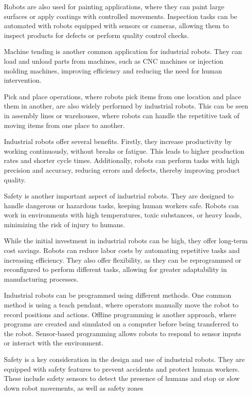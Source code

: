 Robots are also used for painting applications, where they can paint large surfaces or apply coatings with controlled movements. Inspection tasks can be automated with robots equipped with sensors or cameras, allowing them to inspect products for defects or perform quality control checks.

Machine tending is another common application for industrial robots. They can load and unload parts from machines, such as CNC machines or injection molding machines, improving efficiency and reducing the need for human intervention.

Pick and place operations, where robots pick items from one location and place them in another, are also widely performed by industrial robots. This can be seen in assembly lines or warehouses, where robots can handle the repetitive task of moving items from one place to another.

Industrial robots offer several benefits. Firstly, they increase productivity by working continuously, without breaks or fatigue. This leads to higher production rates and shorter cycle times. Additionally, robots can perform tasks with high precision and accuracy, reducing errors and defects, thereby improving product quality.

Safety is another important aspect of industrial robots. They are designed to handle dangerous or hazardous tasks, keeping human workers safe. Robots can work in environments with high temperatures, toxic substances, or heavy loads, minimizing the risk of injury to humans.

While the initial investment in industrial robots can be high, they offer long-term cost savings. Robots can reduce labor costs by automating repetitive tasks and increasing efficiency. They also offer flexibility, as they can be reprogrammed or reconfigured to perform different tasks, allowing for greater adaptability in manufacturing processes.

Industrial robots can be programmed using different methods. One common method is using a teach pendant, where operators manually move the robot to record positions and actions. Offline programming is another approach, where programs are created and simulated on a computer before being transferred to the robot. Sensor-based programming allows robots to respond to sensor inputs or interact with the environment.

Safety is a key consideration in the design and use of industrial robots. They are equipped with safety features to prevent accidents and protect human workers. These include safety sensors to detect the presence of humans and stop or slow down robot movements, as well as safety zones

